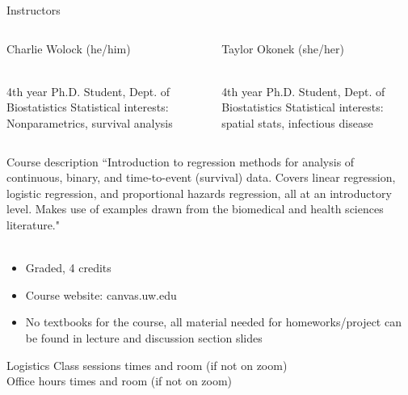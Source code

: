 \documentclass{beamer}
\begin{document}
\begin{frame}{Instructors}
\begin{columns}
	\begin{column}[t]{0.4\textwidth}
            \small Charlie Wolock (he/him) \\~\
            
            \small 4th year Ph.D. Student, Dept. of Biostatistics
            \small Statistical interests: Nonparametrics, survival analysis
	\end{column}
	\begin{column}[t]{0.4\textwidth}  %
			\small Taylor Okonek (she/her) \\~\ 
			
			\small 4th year Ph.D. Student, Dept. of Biostatistics
			\small Statistical interests: spatial stats, infectious disease
	\end{column}
\end{columns}

\end{frame}

\begin{frame}{Course description}
``Introduction to regression methods for analysis of continuous, binary, and time-to-event (survival) data. Covers linear regression, logistic regression, and proportional hazards regression, all at an introductory level. Makes use of examples drawn from the biomedical and health sciences literature." \\~\

\begin{itemize}
	\item Graded, 4 credits
	\item Course website: canvas.uw.edu
	\item No textbooks for the course, all material needed for homeworks/project can be found in lecture and discussion section slides
\end{itemize}

\end{frame}

\begin{frame}{Logistics}
Class sessions times and room (if not on zoom) \\
Office hours times and room (if not on zoom)
\end{frame}
\end{document}

